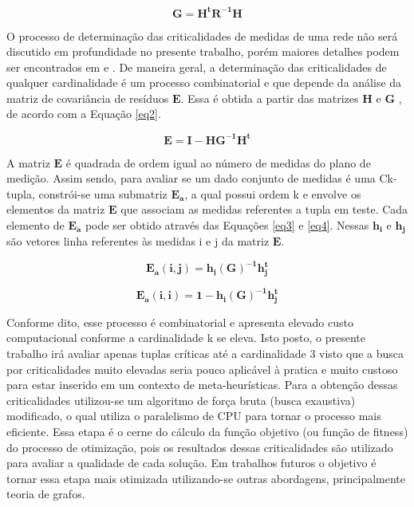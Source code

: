 \documentclass[12pt]{article}
\begin{document}
\begin{equation}
	\mathbf{G= H^tR^{-1}H}
\label{eq1}
\end{equation}

O processo de determinação das criticalidades de medidas de uma rede não será discutido em profundidade no presente trabalho, porém maiores detalhes podem ser encontrados em \cite{AbelTese16} e \cite{BB16}. De maneira geral, a determinação das criticalidades de qualquer cardinalidade é um processo combinatorial e que depende da análise da matriz de covariância de resíduos $\mathbf{E}$. Essa é obtida a partir das matrizes $\mathbf{H}$ e $\mathbf{G}$ \cite{Quant13}, de acordo com a Equação \ref{eq2}.

\begin{equation}
	\mathbf{E= I - HG^{-1}H^t}
	\label{eq2}
\end{equation}

A matriz $\mathbf{E}$ é quadrada de ordem igual ao número de medidas do plano de medição. Assim sendo, para avaliar se um dado conjunto de medidas é uma Ck-tupla, constrói-se uma submatriz $\mathbf{E_a}$, a qual possui ordem k e envolve os elementos da matriz $\mathbf{E}$ que associam as medidas referentes a tupla em teste. Cada elemento de $\mathbf{E_a}$ pode ser obtido através das Equações \ref{eq3} e \ref{eq4}. Nessas $\mathbf{h_i}$ e $\mathbf{h_j}$ são vetores linha referentes às medidas i e j da matriz $\mathbf{E}$.

\begin{equation}
	\mathbf{E_a(i,j)= h_i(G)^{-1}h_ j^t}
	\label{eq3}
\end{equation}
	
\begin{equation}
	\mathbf{E_a(i,i)= 1 -  h_i(G)^{-1}h_ j^t}
	\label{eq4}
\end{equation}

Conforme dito, esse processo é combinatorial e apresenta elevado custo computacional conforme a cardinalidade k se eleva. Isto posto, o presente trabalho irá avaliar apenas tuplas críticas até a cardinalidade 3 visto que a busca por criticalidades muito elevadas seria pouco aplicável à pratica e muito custoso para estar inserido em um contexto de meta-heurísticas. Para a obtenção dessas criticalidades utilizou-se um algoritmo de força bruta (busca exaustiva) modificado, o qual utiliza o paralelismo de CPU para tornar o processo mais eficiente. Essa etapa é o cerne do cálculo da função objetivo (ou função de fitness) do processo de otimização, pois os resultados dessas criticalidades são utilizado para avaliar a qualidade de cada solução. Em trabalhos futuros o objetivo é tornar essa etapa mais otimizada utilizando-se outras abordagens, principalmente teoria de grafos.
\end{document}
